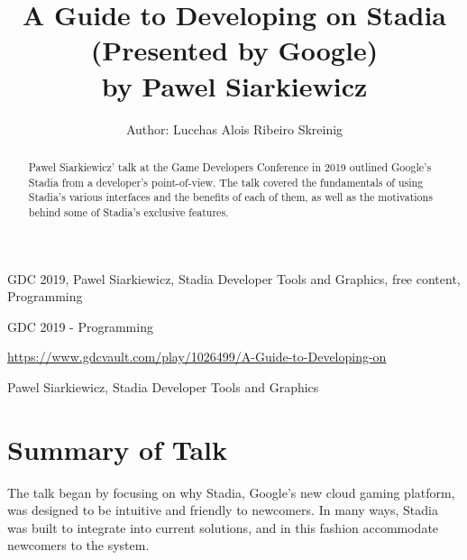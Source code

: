 \documentclass[a4paper]{article}
\title{A Guide to Developing on Stadia (Presented by Google)\\by Pawel Siarkiewicz}
\author{Author: Lucchas Alois Ribeiro Skreinig}
\begin{document}
\maketitle

\begin{keywords} GDC 2019, Pawel Siarkiewicz, Stadia Developer Tools and Graphics, free content, Programming \end{keywords}

\begin{track} GDC 2019 - Programming \end{track}

\begin{talkurl}  \url{https://www.gdcvault.com/play/1026499/A-Guide-to-Developing-on} \end{talkurl}

\begin{speaker}	Pawel Siarkiewicz, Stadia Developer Tools and Graphics \end{speaker}


\begin{abstract}
Pawel Siarkiewicz' talk at the Game Developers Conference in 2019 outlined Google's Stadia from a developer's point-of-view. The talk covered the fundamentals of using Stadia's various interfaces and the benefits of each of them, as well as the motivations behind some of Stadia's exclusive features.

\end{abstract}

\section{Summary of Talk}

The talk began by focusing on why Stadia, Google's new cloud gaming platform, was designed to be intuitive and friendly to newcomers. In many ways, Stadia was built to integrate into current solutions, and in this fashion accommodate newcomers to the system.
\end{document}
